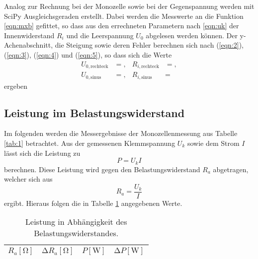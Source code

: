 Analog zur Rechnung bei der Monozelle sowie bei der Gegenspannung werden mit SciPy Ausgleichsgeraden erstellt.
Dabei werden die Messwerte an die Funktion \ref{eqn:mxb} gefittet, so dass aus den errechneten Parametern nach \ref{eqn:uk} der Innenwiderstand $R_i$ und die Leerspannung $U_0$ abgelesen werden können.
Der y-Achenabschnitt, die Steigung sowie deren Fehler berechnen sich nach (\ref{eqn:2}), (\ref{eqn:3}), (\ref{eqn:4}) und (\ref{eqn:5}), so dass sich die Werte
\begin{align*}
  U_{0,{\text{rechteck}}}  &= ,  & R_{i,\text{rechteck}}  &= ,\\
  U_{0,{\text{sinus}}} &= , & R_{i,\text{sinus}} &= 
\end{align*}
ergeben

\subsection{Leistung im Belastungswiderstand}
Im folgenden werden die Messergebnisse der Monozellenmessung aus Tabelle \ref{tab:1} betrachtet.
Aus der gemessenen Klemmspannung $U_k$ sowie dem Strom $I$ lässt sich die Leistung zu
\begin{equation}
  P = U_k I
\end{equation}
berechnen.
Diese Leistung wird gegen den Belastungswiderstand $R_a$ abgetragen, welcher sich aus
\begin{equation}
  R_a = \frac{U_k}{I}
\end{equation}
ergibt.
Hieraus folgen die in Tabelle \ref{tab:leistung} angegebenen Werte.

\begin{table}
  \centering
  \caption{Leistung in Abhängigkeit des Belastungswiderstandes.}
  \label{tab:leistung}
  \begin{tabular}{c c c c}
    \toprule
    {$R_a [\si{\ohm}]$} & {$\increment R_a [\si{\ohm}]$} & {$P [\si{\watt}]$} & {$\increment P [\si{\watt}]$} \\
    \midrule
    
    \bottomrule
  \end{tabular}
\end{table}

